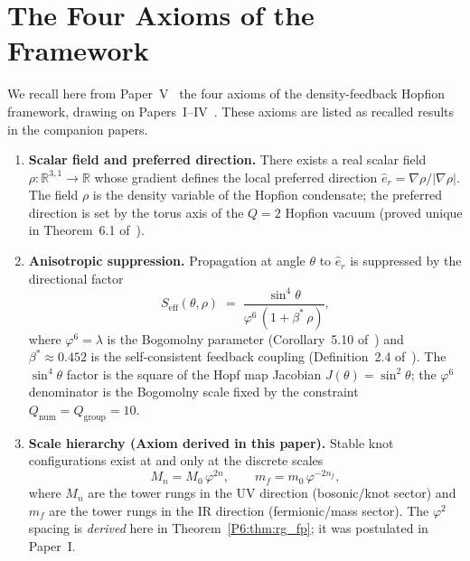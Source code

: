 \documentclass[11pt,a4paper]{article}
\theoremstyle{definition}
\theoremstyle{remark}
\newcommand{\vp}{\varphi}
\newcommand{\lam}{\lambda}
\newcommand{\bst}{\beta^{*}}
\begin{document}
\section{The Four Axioms of the Framework}
\label{P6:sec:axioms}

We recall here from Paper~V~\cite{Paper5} the four axioms of the density-feedback Hopfion framework,
drawing on Papers~I--IV~\cite{Paper1,Paper2,Paper3,Paper4}.
These axioms are listed as recalled results in the companion papers.

\begin{enumerate}[label=\textbf{A\arabic*.},leftmargin=*,itemsep=4pt]

\item \textbf{Scalar field and preferred direction.}
There exists a real scalar field $\rho\colon\mathbb{R}^{3,1}\to\mathbb{R}$
whose gradient defines the local preferred direction
$\hat{e}_r = \nabla\rho/|\nabla\rho|$.  The field $\rho$ is the
density variable of the Hopfion condensate; the preferred direction
is set by the torus axis of the $Q=2$ Hopfion vacuum
(proved unique in Theorem~6.1 of~\cite{Paper1}).

\item \textbf{Anisotropic suppression.}
Propagation at angle $\theta$ to $\hat{e}_r$ is suppressed by the
directional factor
\begin{equation}
  S_{\mathrm{eff}}(\theta, \rho)
  \;=\; \frac{\sin^4\!\theta}{\vp^6\,(1 + \bst\,\rho)},
  \label{P6:eq:seff_axiom}
\end{equation}
where $\vp^6 = \lam$ is the Bogomolny parameter
(Corollary~5.10 of~\cite{Paper1}) and $\bst \approx 0.452$
is the self-consistent feedback coupling
(Definition~2.4 of~\cite{Paper1}).
The $\sin^4\!\theta$ factor is the square of the Hopf map Jacobian
$J(\theta) = \sin^2\!\theta$; the $\vp^6$ denominator is the Bogomolny
scale fixed by the constraint $Q_{\mathrm{num}} = Q_{\mathrm{group}} = 10$.

\item \textbf{Scale hierarchy (Axiom derived in this paper).}
Stable knot configurations exist at and only at the discrete scales
\begin{equation}
  M_n = M_0\,\vp^{2n}, \qquad
  m_f = m_0\,\vp^{-2n_f},
  \label{P6:eq:hierarchy_axiom}
\end{equation}
where $M_n$ are the tower rungs in the UV direction (bosonic/knot sector)
and $m_f$ are the tower rungs in the IR direction (fermionic/mass sector).
The $\vp^2$ spacing is \emph{derived} here in Theorem~\ref{P6:thm:rg_fp};
it was postulated in Paper~I.


\end{enumerate}
\end{document}
